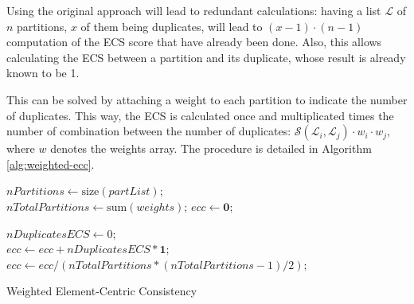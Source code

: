 Using the original approach will lead to redundant calculations: having a list $\mathcal{L}$ of $n$ partitions, $x$ of them being duplicates, will lead to $(x-1) \cdot (n-1)$ computation of the ECS score that have already been done. Also, this allows calculating the ECS between a partition and its duplicate, whose result is already known to be 1.

This can be solved by attaching a weight to each partition to indicate the number of duplicates. This way, the ECS is calculated once and multiplicated times the number of combination between the number of duplicates: $\mathcal{S}(\mathcal{L}_i, \mathcal{L}_j) \cdot w_i \cdot w_j$, where $w$ denotes the weights array. The procedure is detailed in Algorithm \ref{alg:weighted-ecc}. 

\begin{algorithm}[h!] 

    $nPartitions \gets \text{size}(partList)$; \\
    $nTotalPartitions \gets \text{sum}(weights)$; 
    $ecc \gets \textbf{0}$; \\
    
    $nDuplicatesECS \gets 0$; \\
    $ecc \gets ecc + nDuplicatesECS * \textbf{1};$ \\
    $ecc \gets ecc / (nTotalPartitions * (nTotalPartitions - 1) / 2);$ \\
    \caption{Weighted Element-Centric Consistency}
    \label{alg:weighted-ecc}
\end{algorithm}

